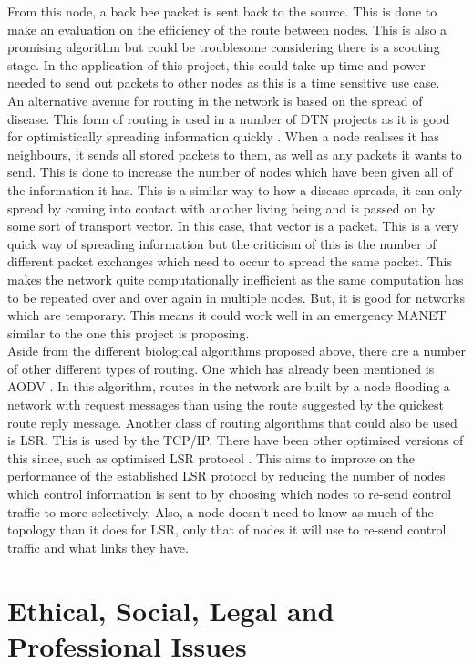 \documentclass{report}
\begin{document}
From this node, a back bee packet is sent back to the source. This is done to make an evaluation on the efficiency of the route between nodes. This is also a promising algorithm but 
could be troublesome considering there is a scouting stage. In the application of this project, this could take up time and power needed to send out packets to other nodes as 
this is a time sensitive use case.
\bigskip\\
An alternative avenue for routing in the network is based on the spread of disease. This form of routing is used in a number of DTN projects as it is good for optimistically 
spreading information quickly \cite{choksatid2016efficient}. When a node realises it has neighbours, it sends all stored packets to them, as well as any packets it wants to 
send. This is done to increase the number of nodes which have been given all of the information it has. This is a similar way to how a disease spreads, it can only spread 
by coming into contact with another living being and is passed on by some sort of transport vector. In this case, that vector is a packet. This is a very quick way of spreading 
information but the criticism of this is the number of different packet exchanges which need to occur to spread the same packet. This makes the network quite computationally 
inefficient as the same computation has to be repeated over and over again in multiple nodes. But, it is good for networks which are temporary. This means it could work well 
in an emergency MANET similar to the one this project is proposing.  
\bigskip\\
Aside from the different biological algorithms proposed above, there are a number of other different types of routing. One which has already been mentioned is AODV \cite{phong2010enhancing}.
In this algorithm, routes in the network are built by a node flooding a network with request messages than using the route suggested by the quickest route reply message. Another 
class of routing algorithms that could also be used is LSR. This is used by the TCP/IP. There have been other optimised versions of this since, such as 
optimised LSR protocol \cite{OLSRP}. This aims to improve on the performance of the established LSR protocol by reducing the number of nodes which control information is sent to 
by choosing which nodes to re-send control traffic to more selectively. Also, a node doesn't need to know as much of the topology than it does for LSR, only that of nodes  
it will use to re-send control traffic and what links they have.

\chapter*{Ethical, Social, Legal and Professional Issues}
\end{document}
